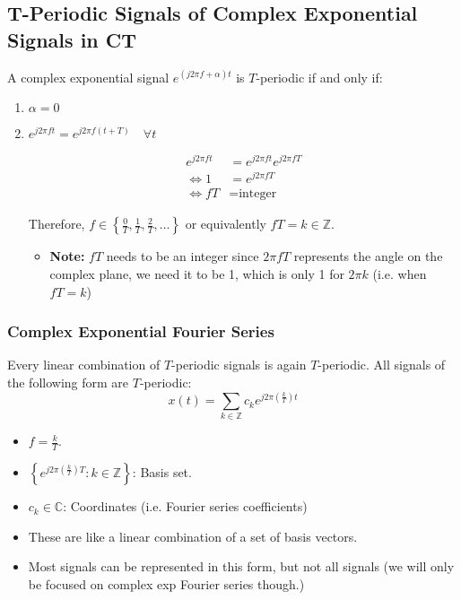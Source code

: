 \subsection{T-Periodic Signals of Complex Exponential Signals in CT}
\begin{definition}
    A complex exponential signal \( e^{(j2\pi f + \alpha)t} \) is \( T \)-periodic if and only if:

    \begin{enumerate}
        \item \( \alpha = 0 \)
        \item \( e^{j 2\pi f t} = e^{j 2\pi f (t + T)} \quad \forall t \)
        
        \begin{align*}
        e^{j 2\pi f t} &= e^{j 2\pi f t} e^{j 2\pi f T} \\
        \Longleftrightarrow 1 &= e^{j 2\pi f T} \\
        \Longleftrightarrow f T &= \text{integer}
        \end{align*}
        
        Therefore, \( f \in \left\{ \frac{0}{T}, \frac{1}{T}, \frac{2}{T}, \dots \right\} \) or equivalently \( f T = k \in \mathbb{Z} \).
        \begin{itemize}
            \item \textbf{Note:} $fT$ needs to be an integer since $2\pi f T$ represents the angle on the complex plane, we need it to be 1, which is only 1 for $2\pi k$ (i.e. when $fT=k$)
        \end{itemize}
    \end{enumerate}
\end{definition}

\subsubsection{Complex Exponential Fourier Series}
\begin{definition}
    Every linear combination of \( T \)-periodic signals is again \( T \)-periodic. All signals of the following form are \( T \)-periodic:
        \[
        x(t) = \sum_{k \in \mathbb{Z}} c_k e^{j 2\pi \left(\frac{k}{T}\right) t}
        \]
    \begin{itemize}
        \item \( f = \frac{k}{T} \).
        \item \( \left\{ e^{j 2\pi \left(\frac{k}{T}\right) T} : k \in \mathbb{Z} \right\} \): Basis set.
        \item \( c_k \in \mathbb{C}\): Coordinates (i.e. Fourier series coefficients)
        \item These are like a linear combination of a set of basis vectors.      
        \item Most signals can be represented in this form, but not all signals (we will only be focused on complex exp Fourier series though.)
    \end{itemize}
\end{definition}

